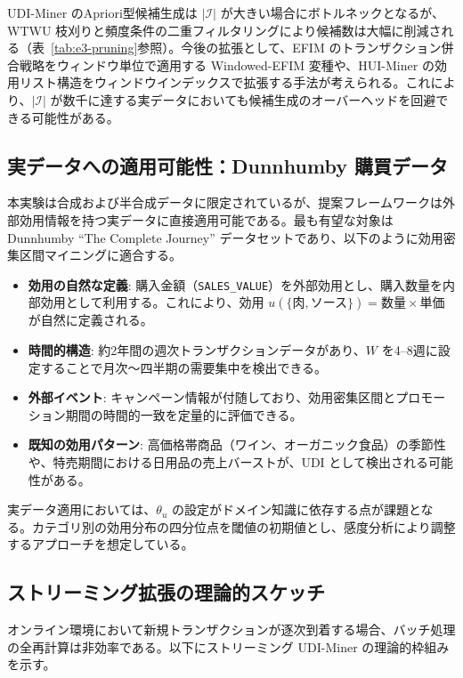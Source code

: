 UDI-Miner のApriori型候補生成は $|\mathcal{I}|$ が大きい場合にボトルネックとなるが、WTWU 枝刈りと頻度条件の二重フィルタリングにより候補数は大幅に削減される（表~\ref{tab:e3-pruning}参照）。今後の拡張として、EFIM のトランザクション併合戦略をウィンドウ単位で適用する Windowed-EFIM 変種や、HUI-Miner の効用リスト構造をウィンドウインデックスで拡張する手法が考えられる。これにより、$|\mathcal{I}|$ が数千に達する実データにおいても候補生成のオーバーヘッドを回避できる可能性がある。

\subsection{実データへの適用可能性：Dunnhumby 購買データ}

本実験は合成および半合成データに限定されているが、提案フレームワークは外部効用情報を持つ実データに直接適用可能である。最も有望な対象は Dunnhumby ``The Complete Journey'' データセットであり、以下のように効用密集区間マイニングに適合する。

\begin{itemize}
  \item \textbf{効用の自然な定義}: 購入金額（\texttt{SALES\_VALUE}）を外部効用とし、購入数量を内部効用として利用する。これにより、効用 $u(\{\text{肉}, \text{ソース}\}) = \text{数量} \times \text{単価}$ が自然に定義される。
  \item \textbf{時間的構造}: 約2年間の週次トランザクションデータがあり、$W$ を4--8週に設定することで月次〜四半期の需要集中を検出できる。
  \item \textbf{外部イベント}: キャンペーン情報が付随しており、効用密集区間とプロモーション期間の時間的一致を定量的に評価できる。
  \item \textbf{既知の効用パターン}: 高価格帯商品（ワイン、オーガニック食品）の季節性や、特売期間における日用品の売上バーストが、UDI として検出される可能性がある。
\end{itemize}

\noindent
実データ適用においては、$\theta_u$ の設定がドメイン知識に依存する点が課題となる。カテゴリ別の効用分布の四分位点を閾値の初期値とし、感度分析により調整するアプローチを想定している。

\subsection{ストリーミング拡張の理論的スケッチ}

オンライン環境において新規トランザクションが逐次到着する場合、バッチ処理の全再計算は非効率である。以下にストリーミング UDI-Miner の理論的枠組みを示す。

